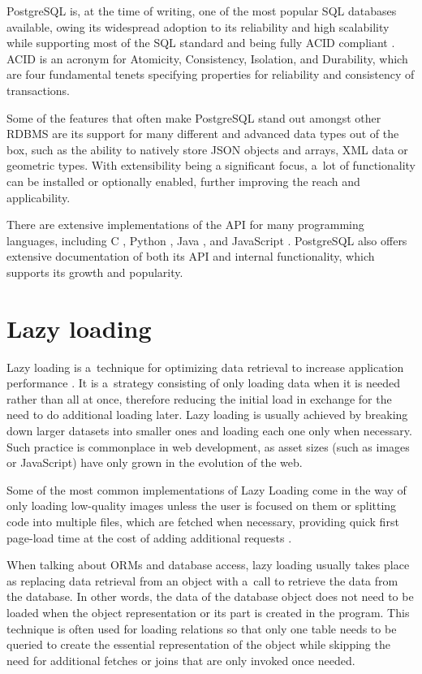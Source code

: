 PostgreSQL is, at the time of writing, one of the most popular SQL databases
available, owing its widespread adoption to its reliability and high scalability
while supporting most of the SQL standard and being fully ACID compliant
\cite{postgres-transaction}. ACID is an acronym for Atomicity, Consistency,
Isolation, and Durability, which are four fundamental tenets specifying
properties for reliability and consistency of transactions.

Some of the features that often make PostgreSQL stand out amongst other RDBMS
are its support for many different and advanced data types
\cite{postgres-datatypes} out of the box, such as the ability to natively store
JSON objects and arrays, XML data or geometric types. With extensibility being a
significant focus, a~lot of functionality can be installed or optionally
enabled, further improving the reach and applicability.

There are extensive implementations of the API for many programming languages,
including C \cite{libpq}, Python \cite{psycopg2}, Java \cite{pgJDBC}, and
JavaScript \cite{node-postgres}. PostgreSQL also offers extensive documentation
of both its API and internal functionality, which supports its growth and
popularity.

\section*{Lazy loading}
Lazy loading is a~technique for optimizing data retrieval to increase
application performance \cite[p.~200]{fowler-patterns-2003}. It is a~strategy consisting of
only loading data when it is needed rather than all at once, therefore reducing
the initial load in exchange for the need to do additional loading later. Lazy
loading is usually achieved by breaking down larger datasets into smaller ones
and loading each one only when necessary. Such practice is commonplace in web
development, as asset sizes (such as images or JavaScript) have only grown in
the evolution of the web.

Some of the most common implementations of Lazy Loading come in the way of only
loading low-quality images unless the user is focused on them or splitting code
into multiple files, which are fetched when necessary, providing quick first
page-load time at the cost of adding additional requests
\cite{webPerformanceMDN}.

When talking about ORMs and database access, lazy loading usually takes place as
replacing data retrieval from an object with a~call to retrieve the data from
the database. In other words, the data of the database object does not need to
be loaded when the object representation or its part is created in the program.
This technique is often used for loading relations so that only one table needs
to be queried to create the essential representation of the object while
skipping the need for additional fetches or joins that are only invoked once
needed.

